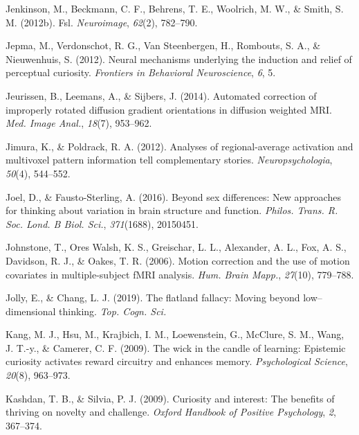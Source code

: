 \documentclass[11pt,american,a4paper,oneside,]{memoir} %
\begin{document}
\leavevmode\hypertarget{ref-jenkinson2012fsl}{}%
Jenkinson, M., Beckmann, C. F., Behrens, T. E., Woolrich, M. W., \& Smith, S. M. (2012b). Fsl. \emph{Neuroimage}, \emph{62}(2), 782--790.

\leavevmode\hypertarget{ref-jepma2012neural}{}%
Jepma, M., Verdonschot, R. G., Van Steenbergen, H., Rombouts, S. A., \& Nieuwenhuis, S. (2012). Neural mechanisms underlying the induction and relief of perceptual curiosity. \emph{Frontiers in Behavioral Neuroscience}, \emph{6}, 5.

\leavevmode\hypertarget{ref-Jeurissen2014-cd}{}%
Jeurissen, B., Leemans, A., \& Sijbers, J. (2014). Automated correction of improperly rotated diffusion gradient orientations in diffusion weighted MRI. \emph{Med. Image Anal.}, \emph{18}(7), 953--962.

\leavevmode\hypertarget{ref-Jimura2012-lv}{}%
Jimura, K., \& Poldrack, R. A. (2012). Analyses of regional-average activation and multivoxel pattern information tell complementary stories. \emph{Neuropsychologia}, \emph{50}(4), 544--552.

\leavevmode\hypertarget{ref-Joel2016-uo}{}%
Joel, D., \& Fausto-Sterling, A. (2016). Beyond sex differences: New approaches for thinking about variation in brain structure and function. \emph{Philos. Trans. R. Soc. Lond. B Biol. Sci.}, \emph{371}(1688), 20150451.

\leavevmode\hypertarget{ref-Johnstone2006-tn}{}%
Johnstone, T., Ores Walsh, K. S., Greischar, L. L., Alexander, A. L., Fox, A. S., Davidson, R. J., \& Oakes, T. R. (2006). Motion correction and the use of motion covariates in multiple-subject fMRI analysis. \emph{Hum. Brain Mapp.}, \emph{27}(10), 779--788.

\leavevmode\hypertarget{ref-Jolly2019-lx}{}%
Jolly, E., \& Chang, L. J. (2019). The flatland fallacy: Moving beyond low--dimensional thinking. \emph{Top. Cogn. Sci.}

\leavevmode\hypertarget{ref-kang2009wick}{}%
Kang, M. J., Hsu, M., Krajbich, I. M., Loewenstein, G., McClure, S. M., Wang, J. T.-y., \& Camerer, C. F. (2009). The wick in the candle of learning: Epistemic curiosity activates reward circuitry and enhances memory. \emph{Psychological Science}, \emph{20}(8), 963--973.

\leavevmode\hypertarget{ref-kashdan2009curiosity}{}%
Kashdan, T. B., \& Silvia, P. J. (2009). Curiosity and interest: The benefits of thriving on novelty and challenge. \emph{Oxford Handbook of Positive Psychology}, \emph{2}, 367--374.
\end{document}
